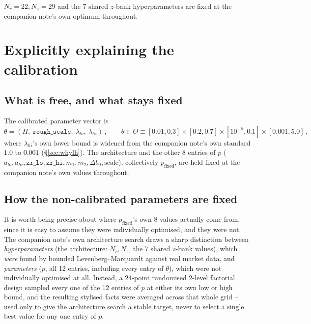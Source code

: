 \documentclass[11pt]{article}
\begin{document}
$N_r=22,N_z=29$ and the 7 shared $z$-bank hyperparameters are fixed at the
companion note's own optimum throughout.

\section{Explicitly explaining the calibration}
\label{sec:calibmethod}

\subsection{What is free, and what stays fixed}
The calibrated parameter vector is
\begin{equation}
\theta = (H,\ \texttt{rough\_scale},\ \lambda_{lo},\ \lambda_{hi})\, ,
\qquad
\theta \in \Theta \equiv [0.01,0.3]\times[0.2,0.7]\times[10^{-5},0.1]
\times[0.001,5.0]\, ,
\label{eq:taylortheta}
\end{equation}
where $\lambda_{hi}$'s own lower bound is widened from the companion note's
own standard $1.0$ to $0.001$ (\S\ref{sec:whylh}). The architecture and the
other 8 entries of $p$ ($a_{lo},a_{hi},\texttt{zr\_lo},\texttt{zr\_hi},
m_1,m_2,\Delta b_0,\text{scale}$), collectively $p_{\text{fixed}}$, are held
fixed at the companion note's own values throughout.

\subsection{How the non-calibrated parameters are fixed}
\label{sec:pfixed}
It is worth being precise about where $p_{\text{fixed}}$'s own 8 values
actually come from, since it is easy to assume they were individually
optimised, and they were not. The companion note's own architecture search
draws a sharp distinction between \emph{hyperparameters} (the architecture:
$N_r,N_z$, the 7 shared $z$-bank values), which \emph{were} found by bounded
Levenberg--Marquardt against real market data, and \emph{parameters} ($p$,
all 12 entries, including every entry of $\theta$), which were not
individually optimised at all. Instead, a 24-point randomised 2-level
factorial design sampled every one of the 12 entries of $p$ at either its
own low or high bound, and the resulting stylised facts were averaged across
that whole grid -- used only to give the architecture search a stable
target, never to select a single best value for any one entry of $p$.
\end{document}
